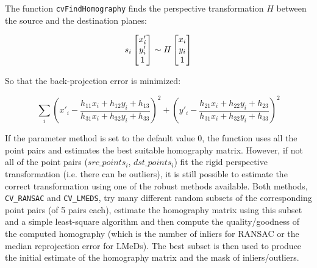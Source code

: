 \begin{description}
\end{description}

The function \texttt{cvFindHomography} finds the perspective transformation $H$ between the source and the destination planes:

\[
s_i \begin{bmatrix} x'_i\\ y'_i\\ 1 \end{bmatrix} \sim H \begin{bmatrix} x_i\\ y_i\\ 1 \end{bmatrix}
\]

So that the back-projection error is minimized:

\[
\sum_i
\left( x'_i-\frac{h_{11} x_i + h_{12} y_i + h_{13}}{h_{31} x_i + h_{32} y_i + h_{33}} \right)^2+
\left( y'_i-\frac{h_{21} x_i + h_{22} y_i + h_{23}}{h_{31} x_i + h_{32} y_i + h_{33}} \right)^2
\]

If the parameter method is set to the default value 0, the function
uses all the point pairs and estimates the best suitable homography
matrix. However, if not all of the point pairs ($src\_points_i$,
$dst\_points_i$) fit the rigid perspective transformation (i.e. there
can be outliers), it is still possible to estimate the correct
transformation using one of the robust methods available. Both
methods, \texttt{CV\_RANSAC} and \texttt{CV\_LMEDS}, try many different random subsets
of the corresponding point pairs (of 5 pairs each), estimate
the homography matrix using this subset and a simple least-square
algorithm and then compute the quality/goodness of the computed homography
(which is the number of inliers for RANSAC or the median reprojection
error for LMeDs). The best subset is then used to produce the initial
estimate of the homography matrix and the mask of inliers/outliers.

